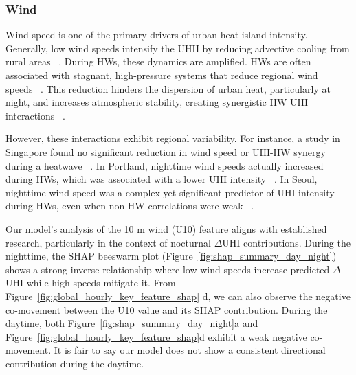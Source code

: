 


\subsubsection*{Wind}Wind speed is one of the primary drivers of urban heat island intensity. Generally, low wind speeds intensify the UHII by reducing advective cooling from rural areas\unskip~\cite{2755510:33598893,2755510:33598924,2755510:33598926,2755510:33598952,2755510:33598927,2755510:33598930} . During HWs, these dynamics are amplified. HWs are often associated with stagnant, high-pressure systems that reduce regional wind speeds\unskip~\cite{2755510:33598926} . This reduction hinders the dispersion of urban heat, particularly at night, and increases atmospheric stability, creating synergistic HW UHI interactions\unskip~\cite{2755510:33598950,2755510:33598926,2755510:33598891,2755510:33598941,2755510:33598930} . 

However, these interactions exhibit regional variability. For instance, a study in Singapore found no significant reduction in wind speed or UHI-HW synergy during a heatwave\unskip~\cite{2755510:33598915} . In Portland, nighttime wind speeds actually increased during HWs, which was associated with a lower UHI intensity\unskip~\cite{2755510:33598921} . In Seoul, nighttime wind speed was a complex yet significant predictor of UHI intensity during HWs, even when non-HW correlations were weak\unskip~\cite{2755510:33598952} .

Our model's analysis of the 10 m wind (U10)  feature aligns with established research, particularly in the context of nocturnal \ensuremath{\Delta }UHI contributions. During the nighttime, the SHAP beeswarm plot (Figure~\ref{fig:shap_summary_day_night}) shows a strong inverse relationship where low wind speeds increase predicted \ensuremath{\Delta }UHI while high speeds mitigate it. From Figure~\ref{fig:global_hourly_key_feature_shap} d, we can also observe the negative co-movement between the U10 value and its SHAP contribution.  During the daytime,  both Figure~\ref{fig:shap_summary_day_night}a and Figure~\ref{fig:global_hourly_key_feature_shap}d exhibit a weak negative co-movement. It is fair to say our model does not show a consistent directional contribution during the daytime.





